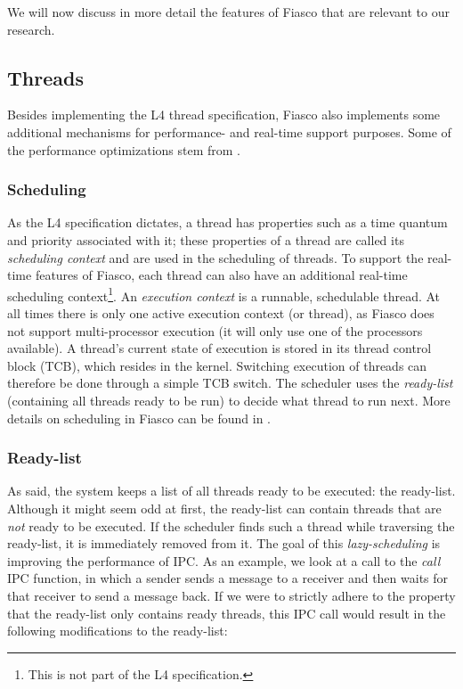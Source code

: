 We will now discuss in more detail the features of Fiasco that are relevant to our research.

\subsection{Threads}
Besides implementing the L4 thread specification, Fiasco also implements some additional mechanisms for performance- and real-time support purposes. Some of the performance optimizations stem from \cite{liedtke93improve}.

\subsubsection{Scheduling}
As the L4 specification dictates, a thread has properties such as a time quantum and priority associated with it; these properties of a thread are called its \emph{scheduling context} and are used in the scheduling of threads. To support the real-time features of Fiasco, each thread can also have an additional real-time scheduling context\footnote{This is not part of the L4 specification.}. An \emph{execution context} is a runnable, schedulable thread. At all times there is only one active execution context (or thread), as Fiasco does not support multi-processor execution (it will only use one of the processors available). A thread's current state of execution is stored in its thread control block (TCB), which resides in the kernel. Switching execution of threads can therefore be done through a simple TCB switch. The scheduler uses the \emph{ready-list} (containing all threads ready to be run) to decide what thread to run next. More details on scheduling in Fiasco can be found in \cite{steinberg05quality}.

\subsubsection{Ready-list}
As said, the system keeps a list of all threads ready to be executed: the ready-list. Although it might seem odd at first, the ready-list can contain threads that are \textit{not} ready to be executed. If the scheduler finds such a thread while traversing the ready-list, it is immediately removed from it. The goal of this \emph{lazy-scheduling} is improving the performance of IPC. As an example, we look at a call to the \emph{call} IPC function, in which a sender sends a message to a receiver and then waits for that receiver to send a message back. If we were to strictly adhere to the property that the ready-list only contains ready threads, this IPC call would result in the following modifications to the ready-list:

